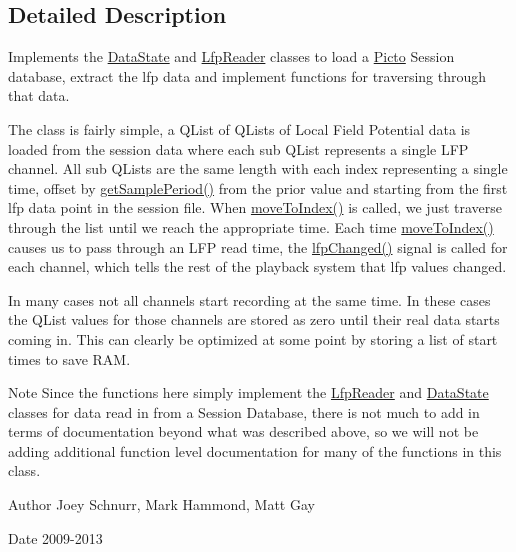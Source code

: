 \subsection{Detailed Description}
Implements the \hyperlink{class_picto_1_1_data_state}{Data\-State} and \hyperlink{class_picto_1_1_lfp_reader}{Lfp\-Reader} classes to load a \hyperlink{namespace_picto}{Picto} Session database, extract the lfp data and implement functions for traversing through that data. 

The class is fairly simple, a Q\-List of Q\-Lists of Local Field Potential data is loaded from the session data where each sub Q\-List represents a single L\-F\-P channel. All sub Q\-Lists are the same length with each index representing a single time, offset by \hyperlink{class_picto_1_1_lfp_state_ad71f4b27e2033d1db0f9d4249ecfe969}{get\-Sample\-Period()} from the prior value and starting from the first lfp data point in the session file. When \hyperlink{class_picto_1_1_lfp_state_acd6593b8cb11d4aa974b629871eab6dd}{move\-To\-Index()} is called, we just traverse through the list until we reach the appropriate time. Each time \hyperlink{class_picto_1_1_lfp_state_acd6593b8cb11d4aa974b629871eab6dd}{move\-To\-Index()} causes us to pass through an L\-F\-P read time, the \hyperlink{class_picto_1_1_lfp_state_ac3b0a1f8b2e9fe8161f5144d388b2162}{lfp\-Changed()} signal is called for each channel, which tells the rest of the playback system that lfp values changed.

In many cases not all channels start recording at the same time. In these cases the Q\-List values for those channels are stored as zero until their real data starts coming in. This can clearly be optimized at some point by storing a list of start times to save R\-A\-M.

\begin{DoxyNote}{Note}
Since the functions here simply implement the \hyperlink{class_picto_1_1_lfp_reader}{Lfp\-Reader} and \hyperlink{class_picto_1_1_data_state}{Data\-State} classes for data read in from a Session Database, there is not much to add in terms of documentation beyond what was described above, so we will not be adding additional function level documentation for many of the functions in this class.
\end{DoxyNote}
\begin{DoxyAuthor}{Author}
Joey Schnurr, Mark Hammond, Matt Gay 
\end{DoxyAuthor}
\begin{DoxyDate}{Date}
2009-\/2013 
\end{DoxyDate}


